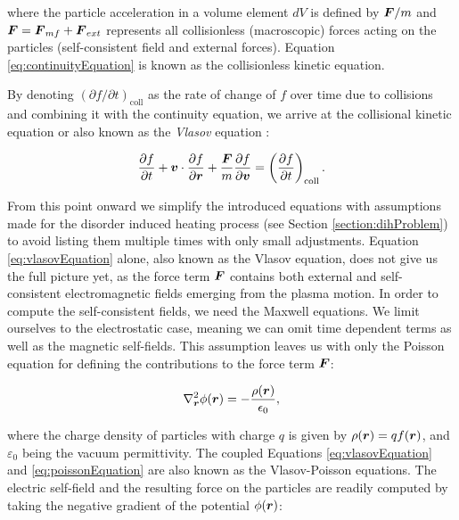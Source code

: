 where the particle acceleration in a volume element $dV$ is defined by $\boldsymbol{F} / m$ and $\boldsymbol{F} = \boldsymbol{F}_{mf} + \boldsymbol{F}_{ext}$ represents all collisionless (macroscopic) forces acting on the
particles (self-consistent field and external forces).
Equation \ref{eq:continuityEquation} is known as the collisionless kinetic equation.

By denoting $(\partial f/\partial t)_{\text{coll}}$ as the rate of change of $f$ over time due to
collisions and combining it with the continuity equation, we arrive at the
collisional kinetic equation or also known as the \emph{Vlasov} equation \cite{boyd_sanderson_2003}:

\begin{equation}
    \frac{\partial f}{\partial t} + \boldsymbol{v} \cdot \frac{\partial f}{\partial \boldsymbol{r}} + \frac{\boldsymbol{F}}{m}
    \frac{\partial f}{\partial \boldsymbol{v}} = \left( \frac{\partial f}{\partial t} \right)_{\text{coll}}.
    \label{eq:vlasovEquation}
\end{equation}

From this point onward we simplify the introduced equations with assumptions
made for the disorder induced heating process (see Section \ref{section:dihProblem}) to avoid listing them multiple times with only small adjustments.
Equation \ref{eq:vlasovEquation} alone, also known as the Vlasov equation, does not give us the full picture yet, as the force term $\boldsymbol{F}$ contains both
external and self-consistent electromagnetic fields emerging from the plasma motion.
In order to compute the self-consistent fields, we need the Maxwell equations.
We limit ourselves to the electrostatic case, meaning we can omit time dependent terms as well
as the magnetic self-fields.
This assumption leaves us with only the Poisson equation for defining the contributions to the
force term $\boldsymbol{F}$:

\begin{equation}
\nabla_{\boldsymbol{r}}^2 \phi(\boldsymbol{r}) = - \frac{\rho(\boldsymbol{r})}{\epsilon_0},
    \label{eq:poissonEquation}
\end{equation}

where the charge density of particles with charge $q$ is given by $\rho(\boldsymbol{r}) = q f(\boldsymbol{r})$,
and $\varepsilon_0$ being the vacuum permittivity.
The coupled Equations \ref{eq:vlasovEquation} and \ref{eq:poissonEquation} are also known
as the Vlasov-Poisson equations.
The electric self-field and the resulting force on the particles are readily computed by taking the negative gradient of the potential
$\phi(\boldsymbol{r})$:

